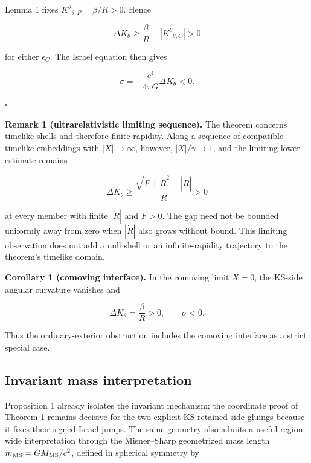 \documentclass[pdflatex,sn-mathphys-num]{sn-jnl}
\begin{document}
Lemma 1 fixes \(K^\theta{}_{\theta,P}=\beta/R>0\). Hence


\begin{equation}
\Delta K_\theta
\ge \frac{\beta}{R}
-\left|K^\theta{}_{\theta,C}\right|>0
\tag{25}
\end{equation}

for either \(\epsilon_C\). The Israel equation then gives


\begin{equation}
\boxed{
\sigma=-\frac{c^4}{4\pi G}\Delta K_\theta<0.
}
\tag{26}
\end{equation}

\(\square\)


\textbf{Remark 1 (ultrarelativistic limiting sequence).} The theorem concerns timelike shells and therefore finite rapidity. Along a sequence of compatible timelike embeddings with \(|X|\to\infty\), however, \(|X|/\gamma\to1\), and the limiting lower estimate remains


\[
\Delta K_\theta
\ge\frac{\sqrt{F+\dot R^2}-|\dot R|}{R}>0
\]

at every member with finite \(|\dot R|\) and \(F>0\). The gap need not be bounded uniformly away from zero when \(|\dot R|\) also grows without bound. This limiting observation does not add a null shell or an infinite-rapidity trajectory to the theorem's timelike domain.


\textbf{Corollary 1 (comoving interface).} In the comoving limit \(X=0\), the KS-side angular curvature vanishes and


\begin{equation}
\Delta K_\theta=\frac{\beta}{R}>0,
\qquad
\sigma<0.
\tag{27}
\end{equation}

Thus the ordinary-exterior obstruction includes the comoving interface as a strict special case.


\subsection{Invariant mass interpretation}

Proposition 1 already isolates the invariant mechanism; the coordinate proof of Theorem 1 remains decisive for the two explicit KS retained-side gluings because it fixes their signed Israel jumps. The same geometry also admits a useful region-wide interpretation through the Misner--Sharp geometrized mass length \(m_{\rm MS}=GM_{\rm MS}/c^2\), defined in spherical symmetry by
\end{document}
